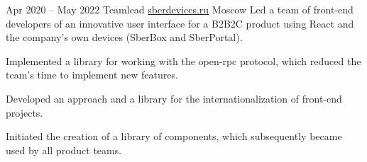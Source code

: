 \cventry
  {Apr 2020 – May 2022}
  {Teamlead}
  {\href{https://sberdevices.ru}{sberdevices.ru}}
  {Moscow}
  {}
  {Led a team of front-end developers of an innovative user interface for a B2B2C product using React and the company's own devices (SberBox and SberPortal).}

\cvlistitem
  {Implemented a library for working with the open-rpc protocol, which reduced the team's time to implement new features.}

\cvlistitem
  {Developed an approach and a library for the internationalization of front-end projects.}

\cvlistitem
  {Initiated the creation of a library of components, which subsequently became used by all product teams.}
